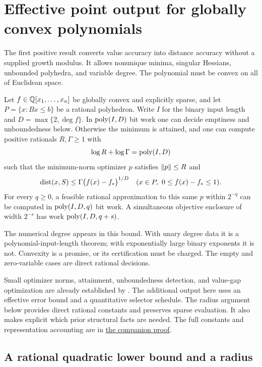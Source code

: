 \section{Effective point output for globally convex polynomials}
\label{sec:global}

The first positive result converts value accuracy into distance accuracy
without a supplied growth modulus. It allows nonunique minima, singular
Hessians, unbounded polyhedra, and variable degree. The polynomial must be
convex on all of Euclidean space.

\begin{theorem}\label{thm:global}
Let $f\in\mathbb Q[x_1,\ldots,x_n]$ be globally convex and explicitly sparse,
and let $P=\{x:Bx\le b\}$ be a rational polyhedron. Write $I$ for the
binary input length and $D=\max\{2,\deg f\}$. In $\operatorname{poly}(I,D)$ bit work
one can decide emptiness and unboundedness below. Otherwise the minimum is
attained, and one can compute positive rationals $R,\Gamma\ge1$ with
\[
 \log R+\log\Gamma=\operatorname{poly}(I,D)
\]
such that the minimum-norm optimizer $p$ satisfies $\left\lVert p\right\rVert\le R$ and
\begin{equation}\label{eq:global-error}
 \operatorname{dist}(x,S)\le\Gamma\bigl(f(x)-f_*\bigr)^{1/D}
 \quad(x\in P,\ 0\le f(x)-f_*\le1).
\end{equation}
For every $q\ge0$, a feasible rational approximation to this same $p$
within $2^{-q}$ can be computed in $\operatorname{poly}(I,D,q)$ bit work. A simultaneous
objective enclosure of width $2^{-s}$ has work $\operatorname{poly}(I,D,q+s)$.
\end{theorem}

The numerical degree appears in this bound. With unary degree data it is a
polynomial-input-length theorem; with exponentially large binary exponents
it is not. Convexity is a promise, or its certification must be charged.
The empty and zero-variable cases are direct rational decisions.

Small optimizer norms, attainment, unboundedness detection, and value-gap
optimization are already established by \citet{SlotSteurerWiedmer2025}. The additional
output here uses an effective error bound and a quantitative selector
schedule. The radius argument below provides direct rational constants and
preserves sparse evaluation. It also makes explicit which prior structural
facts are needed. The full constants and representation accounting are in
\href{../global-point/theorem.md}{the companion proof}.

\subsection{A rational quadratic lower bound and a radius}

